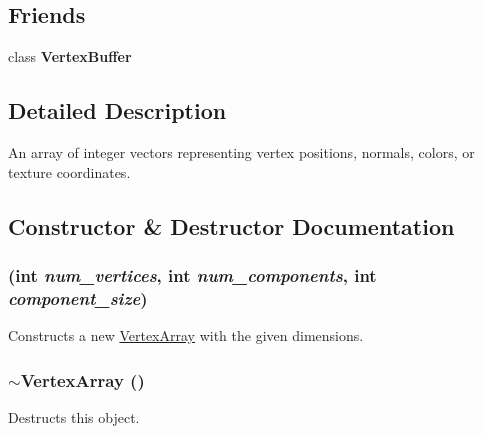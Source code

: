 \subsection*{Friends}
\begin{CompactItemize}
\item 
\hypertarget{classm3g_1_1VertexArray_9ef9a3db41cb54690169922706e1d3c5}{
class \textbf{VertexBuffer}}
\label{classm3g_1_1VertexArray_9ef9a3db41cb54690169922706e1d3c5}

\end{CompactItemize}


\subsection{Detailed Description}
An array of integer vectors representing vertex positions, normals, colors, or texture coordinates. 

\subsection{Constructor \& Destructor Documentation}
\hypertarget{classm3g_1_1VertexArray_5f38e30d23b5dc34b223e749e8afd0d0}{
\subsubsection[{VertexArray}]{ (int {\em num\_\-vertices}, \/  int {\em num\_\-components}, \/  int {\em component\_\-size})}}
\label{classm3g_1_1VertexArray_5f38e30d23b5dc34b223e749e8afd0d0}


Constructs a new \hyperlink{classm3g_1_1VertexArray}{VertexArray} with the given dimensions. \hypertarget{classm3g_1_1VertexArray_267fa63cb2f4216729437dc826415911}{
\subsubsection[{$\sim$VertexArray}]{\setlength{\rightskip}{0pt plus 5cm}$\sim${\bf VertexArray} ()}}
\label{classm3g_1_1VertexArray_267fa63cb2f4216729437dc826415911}


Destructs this object. 


